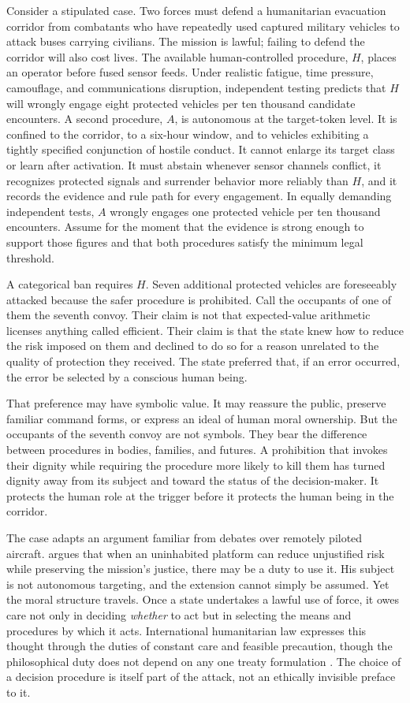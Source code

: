 \documentclass[11pt]{article}
\begin{document}
Consider a stipulated case. Two forces must defend a humanitarian evacuation corridor from combatants who have repeatedly used captured military vehicles to attack buses carrying civilians. The mission is lawful; failing to defend the corridor will also cost lives. The available human-controlled procedure, $H$, places an operator before fused sensor feeds. Under realistic fatigue, time pressure, camouflage, and communications disruption, independent testing predicts that $H$ will wrongly engage eight protected vehicles per ten thousand candidate encounters. A second procedure, $A$, is autonomous at the target-token level. It is confined to the corridor, to a six-hour window, and to vehicles exhibiting a tightly specified conjunction of hostile conduct. It cannot enlarge its target class or learn after activation. It must abstain whenever sensor channels conflict, it recognizes protected signals and surrender behavior more reliably than $H$, and it records the evidence and rule path for every engagement. In equally demanding independent tests, $A$ wrongly engages one protected vehicle per ten thousand encounters. Assume for the moment that the evidence is strong enough to support those figures and that both procedures satisfy the minimum legal threshold.

A categorical ban requires $H$. Seven additional protected vehicles are foreseeably attacked because the safer procedure is prohibited. Call the occupants of one of them the seventh convoy. Their claim is not that expected-value arithmetic licenses anything called efficient. Their claim is that the state knew how to reduce the risk imposed on them and declined to do so for a reason unrelated to the quality of protection they received. The state preferred that, if an error occurred, the error be selected by a conscious human being.

That preference may have symbolic value. It may reassure the public, preserve familiar command forms, or express an ideal of human moral ownership. But the occupants of the seventh convoy are not symbols. They bear the difference between procedures in bodies, families, and futures. A prohibition that invokes their dignity while requiring the procedure more likely to kill them has turned dignity away from its subject and toward the status of the decision-maker. It protects the human role at the trigger before it protects the human being in the corridor.

The case adapts an argument familiar from debates over remotely piloted aircraft. \citet{strawser2010} argues that when an uninhabited platform can reduce unjustified risk while preserving the mission's justice, there may be a duty to use it. His subject is not autonomous targeting, and the extension cannot simply be assumed. Yet the moral structure travels. Once a state undertakes a lawful use of force, it owes care not only in deciding \emph{whether} to act but in selecting the means and procedures by which it acts. International humanitarian law expresses this thought through the duties of constant care and feasible precaution, though the philosophical duty does not depend on any one treaty formulation \citep{api1977}. The choice of a decision procedure is itself part of the attack, not an ethically invisible preface to it.
\end{document}
